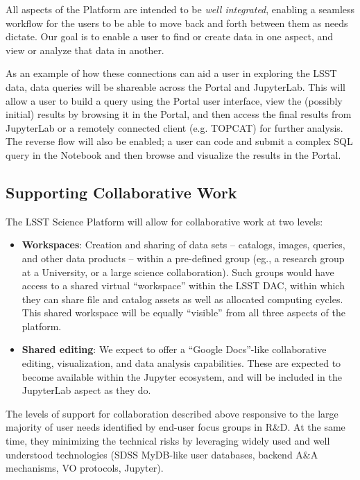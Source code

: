 \documentclass[DM,lsstdraft,toc]{lsstdoc}
\begin{document}
All aspects of the Platform are intended to be {\it well integrated}, enabling a seamless workflow for the users to be able to move back and forth between them as needs dictate.  Our goal is to enable a user to find or create data in one aspect, and view or analyze that data in another.

As an example of how these connections can aid a user in exploring the LSST data, data queries will be shareable across the Portal and JupyterLab. This will allow a user to build a query using the Portal user interface, view the (possibly initial) results by browsing it in the Portal, and then access the final results from JupyterLab or a remotely connected client (e.g. TOPCAT) for further analysis. The reverse flow will also be enabled; a user can code and submit a complex SQL query in the Notebook and then browse and visualize the results in the Portal.

\subsection{Supporting Collaborative Work}

The LSST Science Platform will allow for collaborative work at two levels:
\begin{itemize}
	\item {\bf Workspaces}: Creation and sharing of data sets -- catalogs, images, queries, and other data products -- within a pre-defined group (eg., a research group at a University, or a large science collaboration). Such groups would have access to a shared virtual ``workspace'' within the LSST DAC, within which they can share file and catalog assets as well as allocated computing cycles. This shared workspace will be equally ``visible'' from all three aspects of the platform.
	
	\item {\bf Shared editing}: We expect to offer a ``Google Docs''-like collaborative editing, visualization, and data analysis capabilities. These are expected to become available within the Jupyter ecosystem, and will be included in the JupyterLab aspect as they do.
\end{itemize}

The levels of support for collaboration described above responsive to the large majority of user needs identified by end-user focus groups in R\&D. At the same time, they minimizing the technical risks by leveraging widely used and well understood technologies (SDSS MyDB-like user databases, backend A\&A mechanisms, VO protocols, Jupyter).
\end{document}
